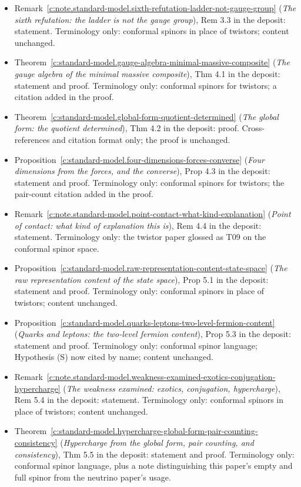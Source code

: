 \documentclass[11pt]{article}
\theoremstyle{definition}
\theoremstyle{plain}
\begin{document}
\begin{itemize}
\item Remark~\ref{c:note.standard-model.sixth-refutation-ladder-not-gauge-group} (\emph{The sixth refutation: the ladder is not the gauge group}), Rem 3.3 in the deposit: statement. Terminology only: conformal spinors in place of twistors; content unchanged.
\item Theorem~\ref{c:standard-model.gauge-algebra-minimal-massive-composite} (\emph{The gauge algebra of the minimal massive composite}), Thm 4.1 in the deposit: statement and proof. Terminology only: conformal spinors for twistors; a citation added in the proof.
\item Theorem~\ref{c:standard-model.global-form-quotient-determined} (\emph{The global form: the quotient determined}), Thm 4.2 in the deposit: proof. Cross-references and citation format only; the proof is unchanged.
\item Proposition~\ref{c:standard-model.four-dimensions-forces-converse} (\emph{Four dimensions from the forces, and the converse}), Prop 4.3 in the deposit: statement and proof. Terminology only: conformal spinors for twistors; the pair-count citation added in the proof.
\item Remark~\ref{c:note.standard-model.point-contact-what-kind-explanation} (\emph{Point of contact: what kind of explanation this is}), Rem 4.4 in the deposit: statement. Terminology only: the twistor paper glossed as T09 on the conformal spinor space.
\item Proposition~\ref{c:standard-model.raw-representation-content-state-space} (\emph{The raw representation content of the state space}), Prop 5.1 in the deposit: statement and proof. Terminology only: conformal spinors in place of twistors; content unchanged.
\item Proposition~\ref{c:standard-model.quarks-leptons-two-level-fermion-content} (\emph{Quarks and leptons: the two-level fermion content}), Prop 5.3 in the deposit: statement and proof. Terminology only: conformal spinor language; Hypothesis (S) now cited by name; content unchanged.
\item Remark~\ref{c:note.standard-model.weakness-examined-exotics-conjugation-hypercharge} (\emph{The weakness examined: exotics, conjugation, hypercharge}), Rem 5.4 in the deposit: statement. Terminology only: conformal spinors in place of twistors; content unchanged.
\item Theorem~\ref{c:standard-model.hypercharge-global-form-pair-counting-consistency} (\emph{Hypercharge from the global form, pair counting, and consistency}), Thm 5.5 in the deposit: statement and proof. Terminology only: conformal spinor language, plus a note distinguishing this paper's empty and full spinor from the neutrino paper's usage.

\end{itemize}
\end{document}

